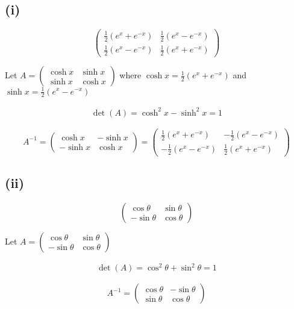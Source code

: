\documentclass[12pt]{article}
\begin{document}
\subsection*{(i)}
\[
	\begin{pmatrix}
		\frac{1}{2}(e^x + e^{-x}) & \frac{1}{2}(e^x - e^{-x}) \\
		\frac{1}{2}(e^x - e^{-x}) & \frac{1}{2}(e^x + e^{-x})
	\end{pmatrix}
\]

Let $A = \begin{pmatrix}
		\cosh x & \sinh x \\
		\sinh x & \cosh x
	\end{pmatrix}$ where $\cosh x = \frac{1}{2}(e^x + e^{-x})$ and $\sinh x = \frac{1}{2}(e^x - e^{-x})$

\begin{align}
	\det(A) = \cosh^2 x - \sinh^2 x = 1
\end{align}

\[
	A^{-1} = \begin{pmatrix}
		\cosh x  & -\sinh x \\
		-\sinh x & \cosh x
	\end{pmatrix} = \begin{pmatrix}
		\frac{1}{2}(e^x + e^{-x})  & -\frac{1}{2}(e^x - e^{-x}) \\
		-\frac{1}{2}(e^x - e^{-x}) & \frac{1}{2}(e^x + e^{-x})
	\end{pmatrix}
\]

\subsection*{(ii)}
\[
	\begin{pmatrix}
		\cos\theta  & \sin\theta \\
		-\sin\theta & \cos\theta
	\end{pmatrix}
\]

Let $A = \begin{pmatrix}
		\cos\theta  & \sin\theta \\
		-\sin\theta & \cos\theta
	\end{pmatrix}$

\begin{align}
	\det(A) = \cos^2\theta + \sin^2\theta = 1
\end{align}

\[
	A^{-1} = \begin{pmatrix}
		\cos\theta & -\sin\theta \\
		\sin\theta & \cos\theta
	\end{pmatrix}
\]
\end{document}
